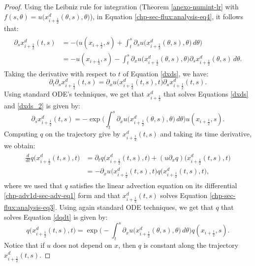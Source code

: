\begin{proof}
Using the Leibniz rule for integration (Theorem \ref{anexo-numint-lr} with 
$f(s,\theta) = u\big(x^d_{i+\frac{1}{2}}(\theta,s),\theta\big)$),
in Equation \eqref{chp-sec-flux:analysis-eq4}, it follows that:
	\begin{align}
		\begin{split}
			\label{dxds}
			{\partial_s x_{i+\frac{1}{2}}^d} (t,s) &= - \bigg({u}(x_{i+\frac{1}{2}},s) + 
			\int_{t}^{s} {\partial_s}{{u}}\big( x_{i+\frac{1}{2}}^d(\theta,s),\theta\big) \,d\theta \bigg)\\
			&=- {u}(x_{i+\frac{1}{2}},s) -
			\int_{t}^{s} {\partial_x}{{u}}\big( x_{i+\frac{1}{2}}^d(\theta, s),\theta\big) 
			{\partial_s  x_{i+\frac{1}{2}}^d}(\theta, s)\,d\theta.
		\end{split}
	\end{align}
	Taking the derivative with respect to $t$ of Equation \eqref{dxds}, we have:
	\begin{equation}
			\label{dxds_2}
			{\partial_t }{\partial_s  x_{i+\frac{1}{2}}^d}
			(t,s) = {\partial_x}{{u}}\big(x_{i+\frac{1}{2}}^d(t, s), t\big) 
			{\partial _s} x_{i+\frac{1}{2}}^d (t, s).
	\end{equation}
	Using standard ODE's techniques, 
	we get that $ x_{i+\frac{1}{2}}^d$ that solves Equations \eqref{dxds} and \eqref{dxds_2}
	is given by:
	\begin{equation}
			\label{xs_int}
			{\partial_s  x_{i+\frac{1}{2}}^d}(t,s) = -
			\exp{\bigg(\int_{t}^{s} {\partial_x}{{u}}\big( x_{i+\frac{1}{2}}^d(\theta,s),\theta\big)  \,d\theta \bigg)}
			{u}(x_{i+\frac{1}{2}},s).
	\end{equation}
	Computing $q$ on the trajectory give by $x_{i+\frac{1}{2}}^d(t,s)$ and taking
	its time derivative, we obtain:
	\begin{align}
		\label{dqdt}
		\begin{split}
			\frac{d}{dt}q\big( x_{i+\frac{1}{2}}^d(t,s),t\big) &= 
			{\partial_t}q\big( x_{i+\frac{1}{2}}^d(t,s),t\big)+
			({u}{\partial_x } 
			q)\big(x_{i+\frac{1}{2}}^d(t,s),t\big) \\
			&= -{\partial_x}{{u}}\big( x_{i+\frac{1}{2}}^d(t,s),t\big) q \big(x_{i+\frac{1}{2}}^d(t,s),t\big),
		\end{split}
	\end{align}
	where we used that $q$ satisfies the linear advection equation on its differential \eqref{chp-adv1d-sec-adv-eq1} form
   and that $x_{i+\frac{1}{2}}^d(t,s)$ solves Equation \eqref{chp-sec-flux:analysis-eq3}.
	Using again standard ODE techniques, we get that $q$ that solves Equation \eqref{dqdt}
	is given by:
	\begin{equation}
			\label{q_int}
			 q\big( x_{i+\frac{1}{2}}^d(t,s),t\big) = 
			\exp{\bigg(-\int_{t}^{s} {\partial_x}{{u}}\big( x_{i+\frac{1}{2}}^d(\theta,s),\theta\big)  \,d\theta \bigg)}
			 q(x_{i+\frac{1}{2}},s).
	\end{equation}
	Notice that if ${u}$ does not depend on $x$, then $q$ is constant along the trajectory $ x_{i+\frac{1}{2}}^d(t,s)$.
	

\end{proof}
